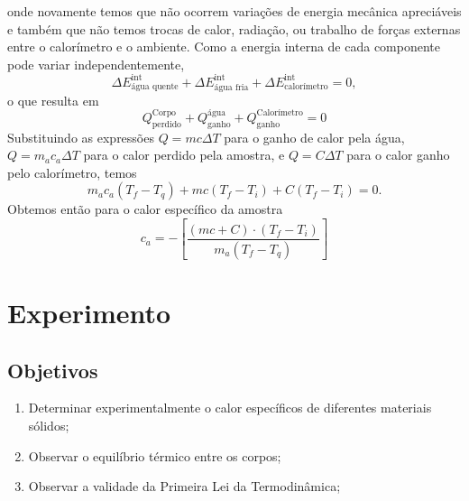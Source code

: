 \noindent{}onde novamente temos que não ocorrem variações de energia mecânica apreciáveis e também que não temos trocas de calor, radiação, ou trabalho de forças externas entre o calorímetro e o ambiente. Como a energia interna de cada componente pode variar independentemente,
\begin{equation}
    \Delta E_{\text{água quente}}^{\text{int}} + \Delta E_{\text{água fria}}^{\text{int}} + \Delta E_{\text{calorímetro}}^{\text{int}} = 0,
\end{equation}
%
o que resulta em
\begin{equation}
	Q^{\text{Corpo}}_{\text{perdido}} + Q^{\text{água}}_{\text{ganho}} + Q^{\text{Calorímetro}}_{\text{ganho}} = 0
\end{equation}
%
Substituindo as expressões $Q = m c \Delta T$ para o ganho de calor pela água, $Q = m_a c_a \Delta T$ para o calor perdido pela amostra, e $Q = C\Delta T$ para o calor ganho pelo calorímetro, temos
\begin{equation}
	m_a c_a (T_f - T_q) + m c (T_f - T_i) + C (T_f-T_i) = 0.
\end{equation}
%
Obtemos então para o calor específico da amostra
\begin{equation}
	c_a = - \left[\frac{(mc + C)\cdot(T_f - T_i)}{m_a (T_f - T_q)}\right]
\end{equation}

\section{Experimento}

\subsection{Objetivos}
\label{Sec:ObjetivosCalorEspecifico}

\begin{enumerate}
	\item Determinar experimentalmente o calor específicos de diferentes materiais sólidos;
	\item Observar o equilíbrio térmico entre os corpos;
	\item Observar a validade da Primeira Lei da Termodinâmica;
\end{enumerate}

